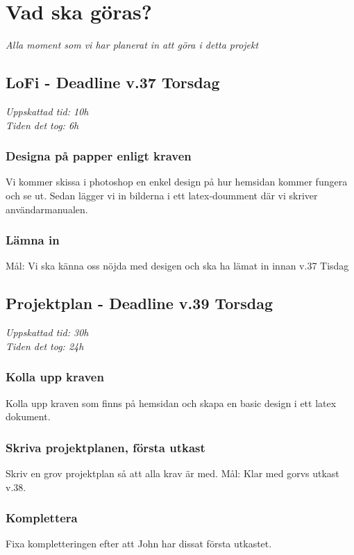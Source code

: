 \documentclass{TDP003mall}
\begin{document}
\newpage

\section{Vad ska göras?}
\textit{Alla moment som vi har planerat in att göra i detta projekt}

\subsection{LoFi - Deadline v.37 Torsdag}
\textit{Uppskattad tid: 10h \\ Tiden det tog: 6h}


\subsubsection{Designa på papper enligt kraven}
Vi kommer skissa i photoshop en enkel design på hur hemsidan kommer fungera och se ut. Sedan lägger vi in bilderna i ett latex-doumment där vi skriver användarmanualen.

\subsubsection{Lämna in}
Mål: Vi ska känna oss nöjda med desigen och ska ha lämat in innan v.37 Tisdag

\subsection{Projektplan - Deadline v.39 Torsdag}
\textit{Uppskattad tid: 30h \\ Tiden det tog: 24h}

\subsubsection{Kolla upp kraven}
Kolla upp kraven som finns på hemsidan och skapa en basic design i ett latex dokument.

\subsubsection{Skriva projektplanen, första utkast}
Skriv en grov projektplan så att alla krav är med.
Mål: Klar med gorvs utkast v.38.

\subsubsection{Komplettera}
Fixa kompletteringen efter att John har dissat första utkastet.
\end{document}
